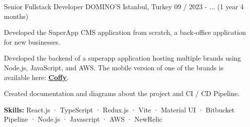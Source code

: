 

\begin{cventries}

\cventry
  {Senior Fullstack Developer} %
  {DOMINO'S} %
  {Istanbul, Turkey} %
  {09 / 2023 - ... (1 year 4 months)}
  {
    \begin{cvitems} %
      \item {Developed the SuperApp CMS application from scratch, a back-office application for new businesses.}
      \item {Developed the backend of a superapp application hosting multiple brands using Node.js, JavaScript, and AWS. The mobile version of one of the brands is available here: \href{https://play.google.com/store/apps/details?id=com.trcoffy.live&hl=en}{\textbf{Coffy}}.}
      \item {Created documentation and diagrams about the project and CI / CD Pipeline.}
      \item {\textbf {Skills:} React.js · TypeScript · Redux.js · Vite · Material UI · Bitbucket Pipeline · Node.js · Javascript · AWS · NewRelic}
    \end{cvitems}
  }


\end{cventries}
